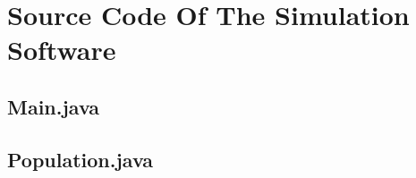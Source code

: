 \chapter{Source Code Of The Simulation Software}
\label{ap:source_code}

\section*{Main.java}
\small
{}

\section*{Population.java}

\normalsize

\chapter{\cite{pfaffelhuber_mullers_2011}}
\label{ap:publication}
